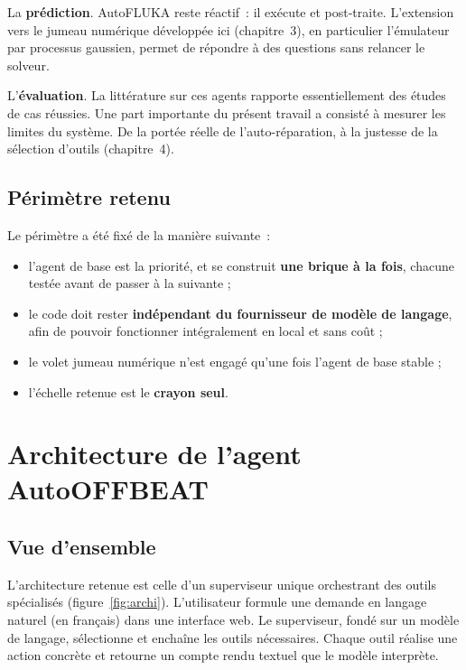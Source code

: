 \documentclass[12pt,a4paper,french]{report}
\begin{document}
La \textbf{prédiction}. AutoFLUKA reste réactif~: il exécute et
post-traite. L'extension vers le jumeau numérique développée ici (chapitre~3),
en particulier l'émulateur par processus gaussien, permet de répondre à des
questions sans relancer le solveur.

L'\textbf{évaluation}. La littérature sur ces agents rapporte
essentiellement des études de cas réussies. Une part importante du présent
travail a consisté à mesurer les limites du système. De la
portée réelle de l'auto-réparation, à la justesse de la sélection d'outils (chapitre~4).

\section{Périmètre retenu}

Le périmètre a été fixé de la manière suivante~:
\begin{itemize}
  \item l'agent de base est la priorité, et se construit \textbf{une brique à
    la fois}, chacune testée avant de passer à la suivante ;
  \item le code doit rester \textbf{indépendant du fournisseur de modèle de
    langage}, afin de pouvoir fonctionner intégralement en local et sans coût ;
  \item le volet jumeau numérique n'est engagé qu'une fois l'agent de base
    stable ;
  \item l'échelle retenue est le \textbf{crayon seul}.
\end{itemize}

\clearpage

\chapter{Architecture de l'agent AutoOFFBEAT}

\section{Vue d'ensemble}

L'architecture retenue est celle d'un superviseur unique orchestrant des outils
spécialisés (figure~\ref{fig:archi}). L'utilisateur formule une demande en
langage naturel (en français) dans une interface web. Le superviseur, fondé sur un modèle de
langage, sélectionne et enchaîne les outils nécessaires. Chaque outil réalise
une action concrète et retourne un compte rendu textuel que le modèle
interprète.
\end{document}
